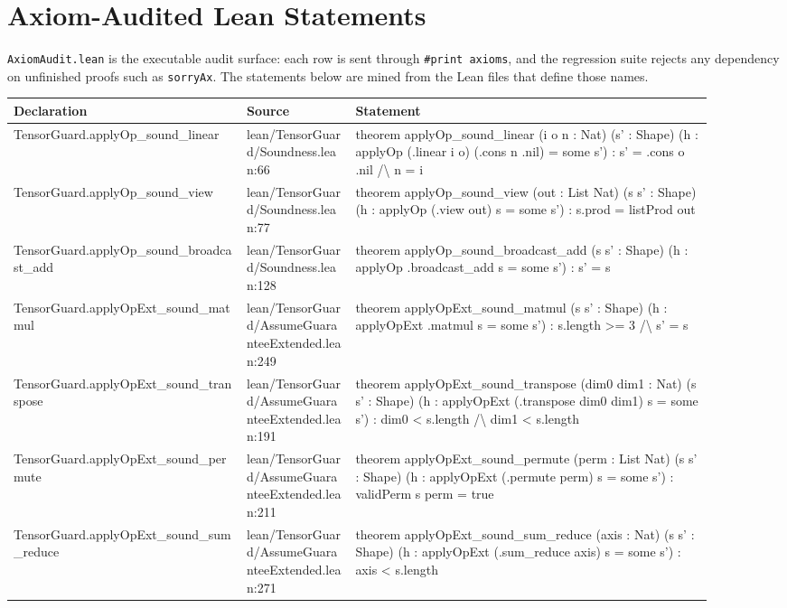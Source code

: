 \documentclass[10pt]{article}
\begin{document}
\section{Axiom-Audited Lean Statements}
\texttt{AxiomAudit.lean} is the executable audit surface: each row is sent through \texttt{\#print axioms}, and the regression suite rejects any dependency on unfinished proofs such as \texttt{sorryAx}. The statements below are mined from the Lean files that define those names.
\begin{longtable}{|p{0.30\linewidth}|p{0.14\linewidth}|p{0.46\linewidth}|}
\hline
\textbf{Declaration} & \textbf{Source} & \textbf{Statement} \\
\hline
TensorGuard.applyOp\_sound\_linear & lean/TensorGuard/Soundness.lean:66 & theorem applyOp\_sound\_linear (i o n : Nat) (s' : Shape) (h : applyOp (.linear i o) (.cons n .nil) = some s') : s' = .cons o .nil /\textbackslash{} n = i \\
\hline
TensorGuard.applyOp\_sound\_view & lean/TensorGuard/Soundness.lean:77 & theorem applyOp\_sound\_view (out : List Nat) (s s' : Shape) (h : applyOp (.view out) s = some s') : s.prod = listProd out \\
\hline
TensorGuard.applyOp\_sound\_broadcast\_add & lean/TensorGuard/Soundness.lean:128 & theorem applyOp\_sound\_broadcast\_add (s s' : Shape) (h : applyOp .broadcast\_add s = some s') : s' = s \\
\hline
TensorGuard.applyOpExt\_sound\_matmul & lean/TensorGuard/AssumeGuaranteeExtended.lean:249 & theorem applyOpExt\_sound\_matmul (s s' : Shape) (h : applyOpExt .matmul s = some s') : s.length >= 3 /\textbackslash{} s' = s \\
\hline
TensorGuard.applyOpExt\_sound\_transpose & lean/TensorGuard/AssumeGuaranteeExtended.lean:191 & theorem applyOpExt\_sound\_transpose (dim0 dim1 : Nat) (s s' : Shape) (h : applyOpExt (.transpose dim0 dim1) s = some s') : dim0 < s.length /\textbackslash{} dim1 < s.length \\
\hline
TensorGuard.applyOpExt\_sound\_permute & lean/TensorGuard/AssumeGuaranteeExtended.lean:211 & theorem applyOpExt\_sound\_permute (perm : List Nat) (s s' : Shape) (h : applyOpExt (.permute perm) s = some s') : validPerm s perm = true \\
\hline
TensorGuard.applyOpExt\_sound\_sum\_reduce & lean/TensorGuard/AssumeGuaranteeExtended.lean:271 & theorem applyOpExt\_sound\_sum\_reduce (axis : Nat) (s s' : Shape) (h : applyOpExt (.sum\_reduce axis) s = some s') : axis < s.length \\

\end{longtable}
\end{document}
